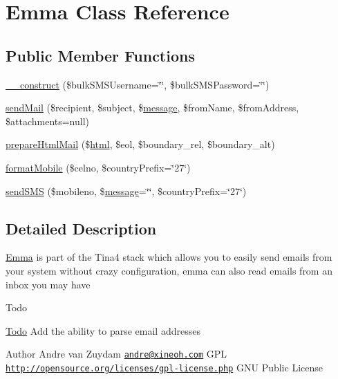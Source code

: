 \hypertarget{classEmma}{}\section{Emma Class Reference}
\label{classEmma}
\subsection*{Public Member Functions}
\begin{DoxyCompactItemize}
\item 
\hyperlink{classEmma_a41ce44cec1c4b79421b8fe2f0c9dc6b6}{\+\_\+\+\_\+construct} (\$bulk\+S\+M\+S\+Username=\char`\"{}\char`\"{}, \$bulk\+S\+M\+S\+Password=\char`\"{}\char`\"{})
\item 
\hyperlink{classEmma_ada88e77bd691cedb6e8ba447d62761f1}{send\+Mail} (\$recipient, \$subject, \$\hyperlink{Tessa_8php_a37ab31c170417027f819bfc053d7cd39}{message}, \$from\+Name, \$from\+Address, \$attachments=null)
\item 
\hyperlink{classEmma_ac39507bf1f8d7fd5d5120d2f46910df1}{prepare\+Html\+Mail} (\$\hyperlink{Shape_8php_a8b267aa0adca2018097f6f6f4c804d46}{html}, \$eol, \$boundary\+\_\+rel, \$boundary\+\_\+alt)
\item 
\hyperlink{classEmma_a7430964a12c547127331eaf2c8fd3a37}{format\+Mobile} (\$celno, \$country\+Prefix=\char`\"{}27\char`\"{})
\item 
\hyperlink{classEmma_adc96eb73ee69ddd33531cd0255ec5c07}{send\+S\+M\+S} (\$mobileno, \$\hyperlink{Tessa_8php_a37ab31c170417027f819bfc053d7cd39}{message}=\char`\"{}\char`\"{}, \$country\+Prefix=\char`\"{}27\char`\"{})
\end{DoxyCompactItemize}


\subsection{Detailed Description}
\hyperlink{classEmma}{Emma} is part of the Tina4 stack which allows you to easily send emails from your system without crazy configuration, emma can also read emails from an inbox you may have \begin{DoxyRefDesc}{Todo}
\item[\hyperlink{todo__todo000003}{Todo}]Add the ability to parse email addresses\end{DoxyRefDesc}


\begin{DoxyAuthor}{Author}
Andre van Zuydam \href{mailto:andre@xineoh.com}{\tt andre@xineoh.\+com}  G\+P\+L  \href{http://opensource.org/licenses/gpl-license.php}{\tt http\+://opensource.\+org/licenses/gpl-\/license.\+php} G\+N\+U Public License 
\end{DoxyAuthor}


